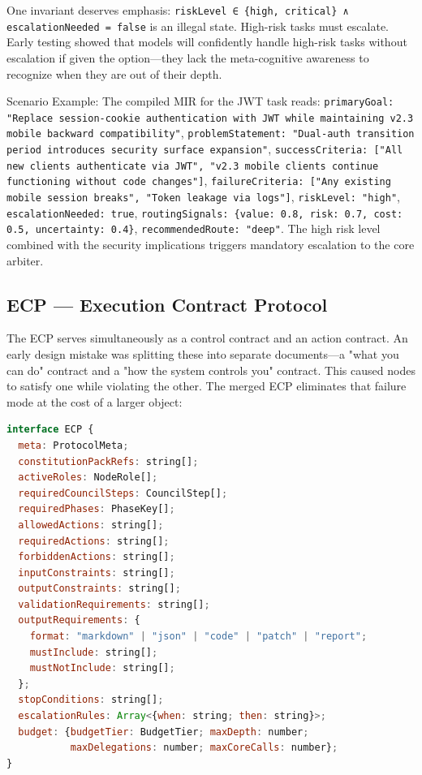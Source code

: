 \documentclass[12pt,a4paper]{article}
\begin{document}
One invariant deserves emphasis: \texttt{riskLevel ∈ \{high, critical\} ∧ escalationNeeded = false} is an illegal state. High-risk tasks must escalate. Early testing showed that models will confidently handle high-risk tasks without escalation if given the option---they lack the meta-cognitive awareness to recognize when they are out of their depth.

Scenario Example: The compiled MIR for the JWT task reads: \texttt{primaryGoal: "Replace session-cookie authentication with JWT while maintaining v2.3 mobile backward compatibility"}, \texttt{problemStatement: "Dual-auth transition period introduces security surface expansion"}, \texttt{successCriteria: ["All new clients authenticate via JWT", "v2.3 mobile clients continue functioning without code changes"]}, \texttt{failureCriteria: ["Any existing mobile session breaks", "Token leakage via logs"]}, \texttt{riskLevel: "high"}, \texttt{escalationNeeded: true}, \texttt{routingSignals: \{value: 0.8, risk: 0.7, cost: 0.5, uncertainty: 0.4\}}, \texttt{recommendedRoute: "deep"}. The high risk level combined with the security implications triggers mandatory escalation to the core arbiter.

\subsection{ECP --- Execution Contract Protocol}


The ECP serves simultaneously as a control contract and an action contract. An early design mistake was splitting these into separate documents---a "what you can do" contract and a "how the system controls you" contract. This caused nodes to satisfy one while violating the other. The merged ECP eliminates that failure mode at the cost of a larger object:

\begin{lstlisting}[language=JavaScript]
interface ECP {
  meta: ProtocolMeta;
  constitutionPackRefs: string[];
  activeRoles: NodeRole[];
  requiredCouncilSteps: CouncilStep[];
  requiredPhases: PhaseKey[];
  allowedActions: string[];
  requiredActions: string[];
  forbiddenActions: string[];
  inputConstraints: string[];
  outputConstraints: string[];
  validationRequirements: string[];
  outputRequirements: {
    format: "markdown" | "json" | "code" | "patch" | "report";
    mustInclude: string[];
    mustNotInclude: string[];
  };
  stopConditions: string[];
  escalationRules: Array<{when: string; then: string}>;
  budget: {budgetTier: BudgetTier; maxDepth: number;
           maxDelegations: number; maxCoreCalls: number};
}
\end{lstlisting}
\end{document}
